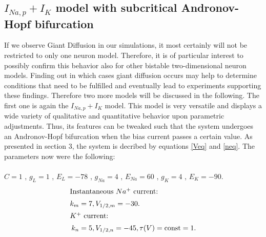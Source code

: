 \documentclass[12pt,a4paper]{article}
\begin{document}
\subsection{$I_{Na,p}+I_K$ model with subcritical Andronov-Hopf bifurcation}
If we observe Giant Diffusion in our simulations, it most certainly will not be restricted to only one neuron model. Therefore, it is of particular interest to possibly confirm this behavior also for other bistable two-dimensional neuron models. Finding out in which cases giant diffusion occurs may help to determine conditions that need to be fulfilled and eventually lead to experiments supporting these findings. Therefore two more models will be discussed in the following.
The first one is again the $I_{Na,p}+I_K$ model.
This model is very versatile and displays a wide variety of qualitative and quantitative behavior upon parametric adjustments. Thus, its features can be tweaked such that the system undergoes an Andronov-Hopf bifurcation when the bias current passes a certain value. As presented in section 3, the system is decribed by equations \ref{Veq} and \ref{neq}. The parameters now were the following:\\\\
$C=1$ , $g_L=1$ , $E_L=-78$ , $g_{Na}=4$ , $E_{Na}=60$ , $g_K=4$ , $E_K=-90$.
\begin{align*}
\intertext{Instantaneous $Na^+$ current:} k_m&=7 , V_{1/2,m}=-30. 
\\
\intertext{$K^+$ current:} k_n&=5 , V_{1/2,n}=-45 , \tau(V)=\text{const}=1.
\end{align*}
\end{document}
